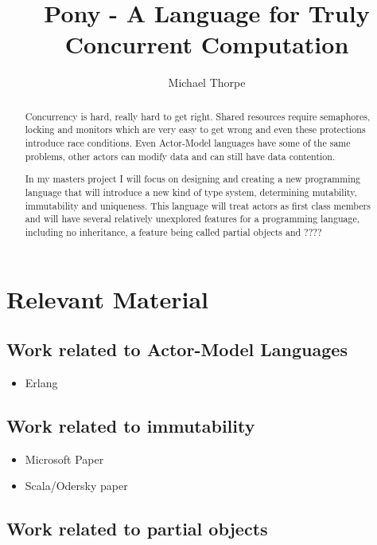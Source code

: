 \documentclass{article}
\begin{document}
\title{Pony - A Language for Truly Concurrent Computation}

\author{Michael Thorpe}

\maketitle

\begin{abstract}
Concurrency is hard, really hard to get right. Shared resources require semaphores, locking and monitors which are very easy to get wrong and even these protections introduce race conditions. Even Actor-Model languages have some of the same problems, other actors can modify data and can still have data contention.

In my masters project I will focus on designing and creating a new programming language that will introduce a new kind of type system, determining mutability, immutability and uniqueness. This language will treat actors as first class members and will have several relatively unexplored features for a programming language, including no inheritance, a feature being called partial objects and ????
\end{abstract}

\section{Relevant Material}

\subsection{Work related to Actor-Model Languages}

\begin{itemize}
	\item Erlang
\end{itemize}

\subsection{Work related to immutability}

\begin{itemize}
	\item Microsoft Paper
	\item Scala/Odersky paper
\end{itemize}

\subsection{Work related to partial objects}
\end{document}
